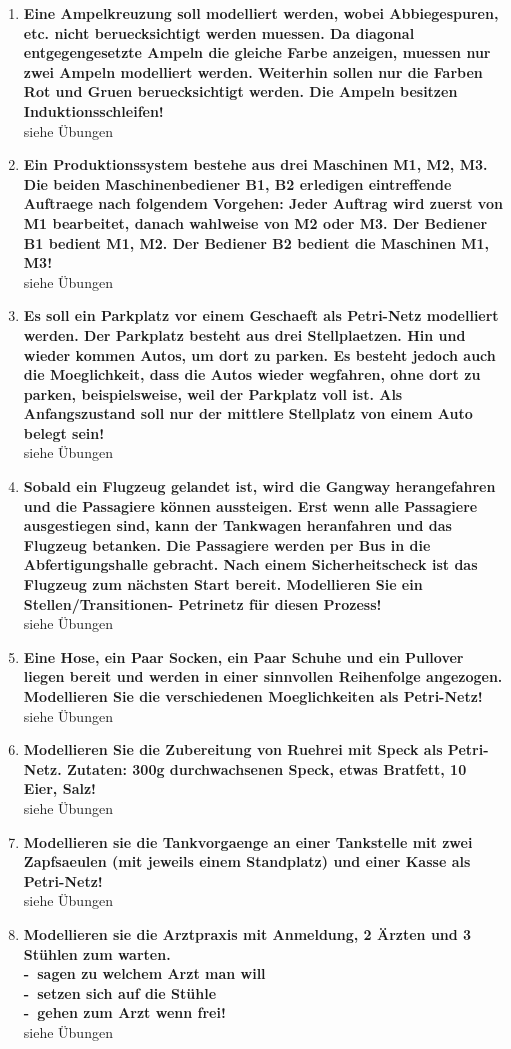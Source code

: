 \documentclass[a4paper,12pt]{article}
\newcommand{\statementnopage}[2]{\pagebreak[3]\item {\textbf{#1!}}#2}
\newcommand{\catchword}[1]{\\-\ #1}
\newcommand{\normaltext}[1]{\\#1}
\begin{document}
\begin{enumerate}
  \statementnopage{Eine Ampelkreuzung soll modelliert werden, wobei Abbiegespuren,
  etc. nicht beruecksichtigt werden muessen. Da diagonal
  entgegengesetzte Ampeln die gleiche Farbe anzeigen, muessen nur
  zwei Ampeln modelliert werden. Weiterhin sollen nur die Farben
  Rot und Gruen beruecksichtigt werden. Die Ampeln besitzen
  Induktionsschleifen}
  {
  \normaltext{siehe Übungen}
  }
  
  \statementnopage{Ein Produktionssystem bestehe aus drei Maschinen M1, M2, M3. Die
  beiden Maschinenbediener B1, B2 erledigen eintreffende Auftraege
  nach folgendem Vorgehen: Jeder Auftrag wird zuerst von M1
  bearbeitet, danach wahlweise von M2 oder M3. Der Bediener B1
  bedient M1, M2. Der Bediener B2 bedient die Maschinen M1, M3}
  {
  \normaltext{siehe Übungen}
  }
  
  \statementnopage{Es soll ein Parkplatz vor einem Geschaeft als Petri-Netz
  modelliert werden. Der Parkplatz besteht aus drei Stellplaetzen.
  Hin und wieder kommen Autos, um dort zu parken. Es besteht jedoch
  auch die Moeglichkeit, dass die Autos wieder wegfahren, ohne dort
  zu parken, beispielsweise, weil der Parkplatz voll ist. Als
  Anfangszustand soll nur der mittlere Stellplatz von einem Auto
  belegt sein}
  {
  \normaltext{siehe Übungen}
  }
  
  \statementnopage{Sobald ein Flugzeug gelandet ist, wird die Gangway herangefahren
  und die Passagiere können aussteigen. Erst wenn alle Passagiere
  ausgestiegen sind, kann der Tankwagen heranfahren und das Flugzeug
  betanken. Die Passagiere werden per Bus in die Abfertigungshalle
  gebracht. Nach einem Sicherheitscheck ist das Flugzeug zum
  nächsten Start bereit. Modellieren Sie ein Stellen/Transitionen-
  Petrinetz für diesen Prozess}
  {
  \normaltext{siehe Übungen}
  }
  
  \statementnopage{Eine Hose, ein Paar Socken, ein Paar Schuhe und ein Pullover liegen
  bereit und werden in einer sinnvollen Reihenfolge angezogen.
  Modellieren Sie die verschiedenen Moeglichkeiten als Petri-Netz}
  {
  \normaltext{siehe Übungen}
  }
  
  \statementnopage{Modellieren Sie die Zubereitung von Ruehrei mit Speck als Petri-Netz.
  Zutaten: 300g durchwachsenen Speck, etwas Bratfett, 10 Eier, Salz}
  {
  \normaltext{siehe Übungen}
  }
  
  \statementnopage{Modellieren sie die Tankvorgaenge an einer Tankstelle mit zwei
  Zapfsaeulen (mit jeweils einem Standplatz) und einer Kasse als
  Petri-Netz}
  {
  \normaltext{siehe Übungen}
  }
  
  \statementnopage{Modellieren sie die Arztpraxis mit Anmeldung, 2 Ärzten und 3 Stühlen zum warten. 
  \catchword{sagen zu welchem Arzt man will}
  \catchword{setzen sich auf die Stühle}
  \catchword{gehen zum Arzt wenn frei}}
  {
  \normaltext{siehe Übungen}
  }

\end{enumerate}
\end{document}
